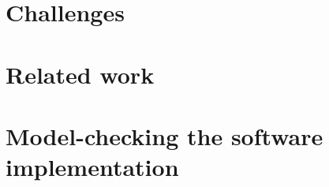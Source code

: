 \documentclass{phd-thesis}
\begin{document}
\chapter{Challenges}\label{sec:chall}


\chapter{Related work}\label{sec:related}




\appendix
\chapter[Model-checking the implementation]{Model-checking the software implementation}\label{sec:full-model}


%


\backmatter

\printindex
\end{document}
